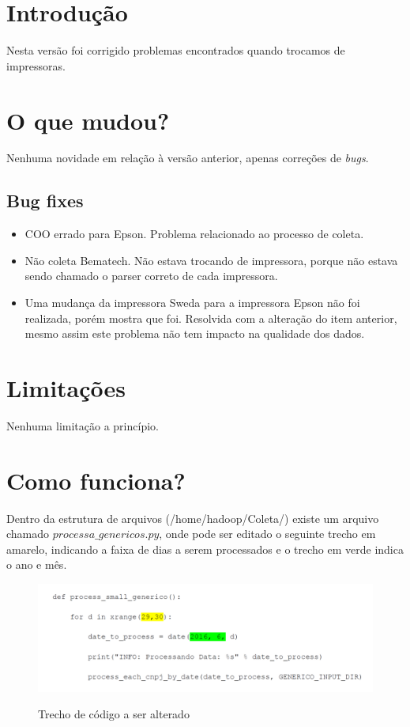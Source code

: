 \documentclass{article}      %
\begin{document}
\section{Introdução}     
Nesta versão foi corrigido problemas encontrados quando trocamos de impressoras.

\section{O que mudou?}

Nenhuma novidade em relação à versão anterior, apenas correções de \emph{bugs}.

\subsection{Bug fixes}
\begin{itemize}
    \item \colorbox{BurntOrange}{COO errado para Epson}. Problema relacionado ao processo de coleta. 
    \item Não coleta Bematech. Não estava trocando de impressora, porque não estava sendo chamado o parser correto de cada impressora.
    \item Uma mudança da impressora Sweda para a impressora Epson não foi realizada, porém mostra que foi. Resolvida com a alteração do item anterior, mesmo assim este problema não tem impacto na qualidade dos dados.
\end{itemize}


\section{Limitações}
Nenhuma limitação a princípio.

\section{Como funciona?}

Dentro da estrutura de arquivos (/home/hadoop/Coleta/) existe um arquivo chamado $processa\_genericos.py$, onde pode ser editado o seguinte trecho em amarelo, indicando a faixa de dias a serem processados e o trecho em verde indica o ano e mês.

\begin{figure}[!ht]
  \centering
    \includegraphics[width=1.0\textwidth]{genericos.png}
  \label{fig:genericos}
  \caption{Trecho de código a ser alterado}
\end{figure}
\end{document}
